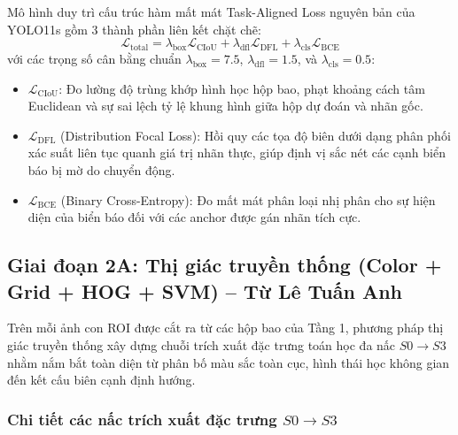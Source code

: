 Mô hình duy trì cấu trúc hàm mất mát Task-Aligned Loss nguyên bản của YOLO11s gồm 3 thành phần liên kết chặt chẽ:
\begin{equation}
    \mathcal{L}_{\text{total}} = \lambda_{\text{box}} \mathcal{L}_{\text{CIoU}} + \lambda_{\text{dfl}} \mathcal{L}_{\text{DFL}} + \lambda_{\text{cls}} \mathcal{L}_{\text{BCE}}
    \label{eq:yolo_task_aligned_loss}
\end{equation}
với các trọng số cân bằng chuẩn $\lambda_{\text{box}} = 7.5$, $\lambda_{\text{dfl}} = 1.5$, và $\lambda_{\text{cls}} = 0.5$:
\begin{itemize}
    \item $\mathcal{L}_{\text{CIoU}}$: Đo lường độ trùng khớp hình học hộp bao, phạt khoảng cách tâm Euclidean và sự sai lệch tỷ lệ khung hình giữa hộp dự đoán và nhãn gốc.
    \item $\mathcal{L}_{\text{DFL}}$ (Distribution Focal Loss): Hồi quy các tọa độ biên dưới dạng phân phối xác suất liên tục quanh giá trị nhãn thực, giúp định vị sắc nét các cạnh biển báo bị mờ do chuyển động.
    \item $\mathcal{L}_{\text{BCE}}$ (Binary Cross-Entropy): Đo mất mát phân loại nhị phân cho sự hiện diện của biển báo đối với các anchor được gán nhãn tích cực.
\end{itemize}

\subsection{Giai đoạn 2A: Thị giác truyền thống (Color + Grid + HOG + SVM) -- Từ Lê Tuấn Anh}
\label{subsec:stage2_svm}

Trên mỗi ảnh con ROI được cắt ra từ các hộp bao của Tầng 1, phương pháp thị giác truyền thống xây dựng chuỗi trích xuất đặc trưng toán học đa nấc $S0 \rightarrow S3$ nhằm nắm bắt toàn diện từ phân bố màu sắc toàn cục, hình thái học không gian đến kết cấu biên cạnh định hướng.

\subsubsection{Chi tiết các nấc trích xuất đặc trưng \texorpdfstring{$S0 \rightarrow S3$}{S0 -> S3}}
\label{subsubsec:feature_steps_s0_s3}

